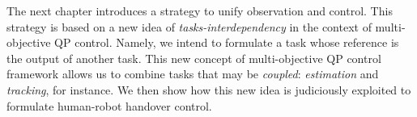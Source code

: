The next chapter introduces a strategy to unify observation and control. This strategy is based on a new idea of \emph{tasks-interdependency} in the context of multi-objective QP control. Namely, we intend to formulate a task whose reference is the output of another task. This new concept of multi-objective QP control framework allows us to combine tasks that may be \emph{coupled}: \emph{estimation} and \emph{tracking}, for instance. We then show how this new idea is judiciously exploited to formulate human-robot handover control. 




